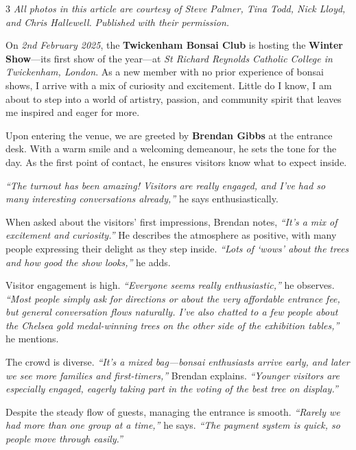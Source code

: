 \begin{multicols}{3}
\noindent
\textit{All photos in this article are courtesy of Steve Palmer, Tina Todd, Nick Lloyd, and Chris Hallewell.}
\textit{Published with their permission.}

\medskip
On \textit{2nd February 2025}, the \textbf{Twickenham Bonsai Club} is hosting the \textbf{Winter Show}---its first show of the year---at \textit{St Richard Reynolds Catholic College in Twickenham, London}.
As a new member with no prior experience of bonsai shows, I arrive with a mix of curiosity and excitement.
Little do I know, I am about to step into a world of artistry, passion, and community spirit that leaves me inspired and eager for more.

\medskip
{}
\noindent
Upon entering the venue, we are greeted by \textbf{Brendan Gibbs} at the entrance desk. 
With a warm smile and a welcoming demeanour, he sets the tone for the day.
As the first point of contact, he ensures visitors know what to expect inside.

\textit{``The turnout has been amazing! Visitors are really engaged, and I've had so many interesting conversations already,''} he says enthusiastically.

When asked about the visitors' first impressions, Brendan notes, \textit{``It's a mix of excitement and curiosity.''} 
He describes the atmosphere as positive, with many people expressing their delight as they step inside. 
\textit{``Lots of `wows' about the trees and how good the show looks,''} he adds.

Visitor engagement is high. 
\textit{``Everyone seems really enthusiastic,''} he observes. 
\textit{``Most people simply ask for directions or about the very affordable entrance fee, but general conversation flows naturally. I've also chatted to a few people about the Chelsea gold medal\--winning trees on the other side of the exhibition tables,''} he mentions.

The crowd is diverse. 
\textit{``It's a mixed bag---bonsai enthusiasts arrive early, and later we see more families and first-timers,''} Brendan explains. 
\textit{``Younger visitors are especially engaged, eagerly taking part in the voting of the best tree on display.''}

Despite the steady flow of guests, managing the entrance is smooth. 
\textit{``Rarely we had more than one group at a time,''} he says. 
\textit{``The payment system is quick, so people move through easily.''}


\end{multicols}
